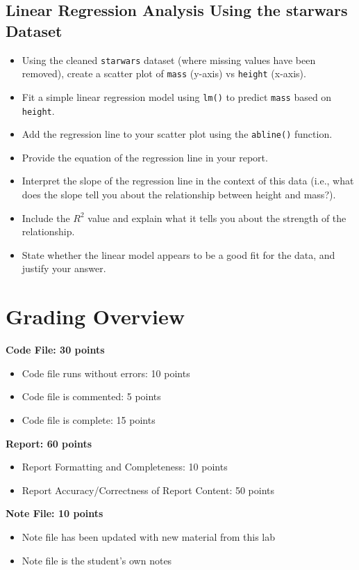 \documentclass{article}
\begin{document}
\subsection*{Linear Regression Analysis Using the starwars Dataset}

\begin{itemize}
    \item Using the cleaned \texttt{starwars} dataset (where missing values have been removed), create a scatter plot of \texttt{mass} (y-axis) vs \texttt{height} (x-axis).
    \item Fit a simple linear regression model using \texttt{lm()} to predict \texttt{mass} based on \texttt{height}.
    \item Add the regression line to your scatter plot using the \texttt{abline()} function.
    \item Provide the equation of the regression line in your report.
    \item Interpret the slope of the regression line in the context of this data (i.e., what does the slope tell you about the relationship between height and mass?).
    \item Include the $R^2$ value and explain what it tells you about the strength of the relationship.
    \item State whether the linear model appears to be a good fit for the data, and justify your answer.
\end{itemize}

\newpage
\section*{Grading Overview}

\textbf{Code File: 30 points}
\begin{itemize}
    \item Code file runs without errors: 10 points
    \item Code file is commented: 5 points
    \item Code file is complete: 15 points
\end{itemize}

\textbf{Report: 60 points}
\begin{itemize}
    \item Report Formatting and Completeness: 10 points
    \item Report Accuracy/Correctness of Report Content: 50 points
\end{itemize}

\textbf{Note File: 10 points}
\begin{itemize}
    \item Note file has been updated with new material from this lab
    \item Note file is the student’s own notes
\end{itemize}
\end{document}
